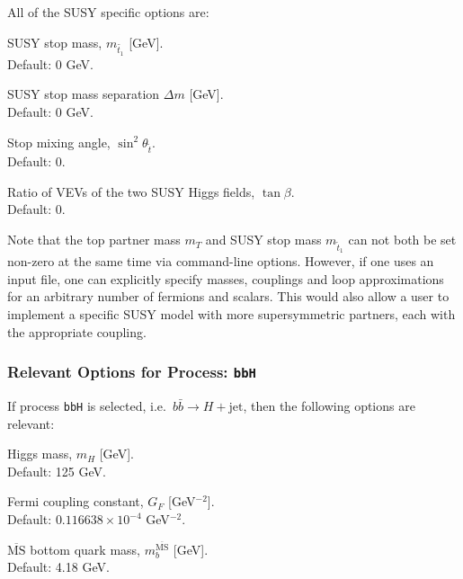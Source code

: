 \documentclass[12pt]{article}
\begin{document}
\noindent All of the SUSY specific options are: 
\begin{description}[labelindent=1cm, labelwidth =\widthof{\bfseries9999999999999999999999}, leftmargin = !] 
	\item[\texttt{--mst <value>}] SUSY stop mass, $m_{\tilde{t_1}}$ [GeV]. \\ Default: 0 GeV. 
	\item[\texttt{--delta <value>}] SUSY stop mass separation $\Delta m$ [GeV]. \\ Default: 0 GeV. 
	\item[\texttt{--sth2 <value>}] Stop mixing angle, $\sin^2 \theta_{\tilde{t}}$. \\ Default: 0. 
	\item[\texttt{--tbeta <value>}] Ratio of VEVs of the two SUSY Higgs fields, $\tan\beta$. \\ Default: 0. 
\end{description}
Note that the top partner mass $m_{T}$ and SUSY stop mass
$m_{\tilde{t}_1}$ can not both be set non-zero at the same time via
command-line options. However, if one uses an input file, one can
explicitly specify masses, couplings and loop approximations for an
arbitrary number of fermions and scalars. This would also allow a user
to implement a specific SUSY model with more supersymmetric partners,
each with the appropriate coupling.

\subsubsection{Relevant Options for Process: \texttt{bbH}}
If process \texttt{bbH} is selected, i.e.\
$
	b\bar{b} \rightarrow H + \text{jet}
$, then the following options are relevant: 
\begin{description}[labelindent=1cm, labelwidth =\widthof{\bfseries9999999999999999999999}, leftmargin = !] 
	\item[\texttt{--mH <value>}] Higgs mass, $m_H$ [GeV]. \\ Default: 125 GeV. 
	\item[\texttt{--GF <value>}] Fermi coupling constant, $G_F$ [GeV$^{-2}$]. \\ Default: $0.116638 \times 10^{-4}$ GeV$^{-2}$. 
	\item[\texttt{--mbmb <value>}] $\overline{\text{MS}}$ bottom quark mass, $m_b^{\overline{\text{MS}}}$ [GeV]. \\ Default: 4.18 GeV. 
\end{description}
\end{document}
